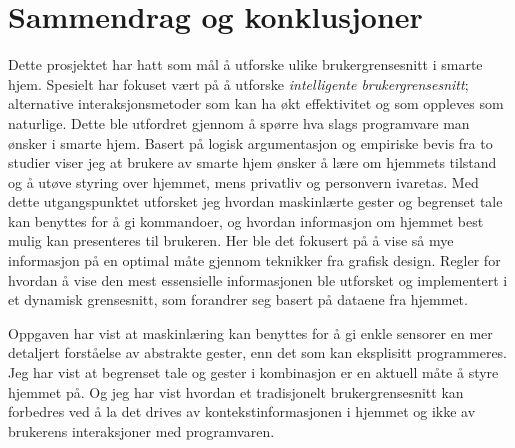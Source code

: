\section*{Sammendrag og konklusjoner}
Dette prosjektet har hatt som mål å utforske ulike brukergrensesnitt i smarte hjem. Spesielt har fokuset vært på å utforske \emph{intelligente brukergrensesnitt}; alternative interaksjonsmetoder som kan ha økt effektivitet og som oppleves som naturlige. Dette ble utfordret gjennom å spørre hva slags programvare man ønsker i smarte hjem. Basert på logisk argumentasjon og empiriske bevis fra to studier viser jeg at brukere av smarte hjem ønsker å lære om hjemmets tilstand og å utøve styring over hjemmet, mens privatliv og personvern ivaretas. Med dette utgangspunktet utforsket jeg hvordan maskinlærte gester og begrenset tale kan benyttes for å gi kommandoer, og hvordan informasjon om hjemmet best mulig kan presenteres til brukeren. Her ble det fokusert på å vise så mye informasjon på en optimal måte gjennom teknikker fra grafisk design. Regler for hvordan å vise den mest essensielle informasjonen ble utforsket og implementert i et dynamisk grensesnitt, som forandrer seg basert på dataene fra hjemmet.

Oppgaven har vist at maskinlæring kan benyttes for å gi enkle sensorer en mer detaljert forståelse av abstrakte gester, enn det som kan eksplisitt programmeres. Jeg har vist at begrenset tale og gester i kombinasjon er en aktuell måte å styre hjemmet på. Og jeg har vist hvordan et tradisjonelt brukergrensesnitt kan forbedres ved å la det drives av kontekstinformasjonen i hjemmet og ikke av brukerens interaksjoner med programvaren.